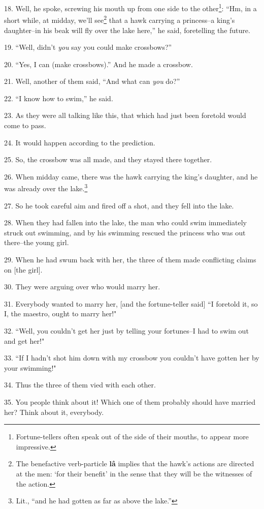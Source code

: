 18. Well, he spoke, screwing his mouth up from one side to the other\footnote{Fortune-tellers often speak out of the side of their mouths, to appear more impressive.}: ``Hm,
in a short while, at midday, we'll see\footnote{The benefactive verb-particle \textbf{lâ} implies that the hawk's actions are directed at the men: `for their benefit' in the sense that they will be the witnesses of the action.} that a hawk carrying a princess--a
king's daughter--in his beak will fly over the lake here,'' he said, foretelling
the future.

19. ``Well, didn't \textit{you} say you could make crossbows?''

20. ``Yes, I can (make crossbows).'' And he made a crossbow.

21. Well, another of them said, ``And what can \textit{you} do?''

22. ``I know how to swim,'' he said.

23. As they were all talking like this, that which had just been foretold would
come to pass.

24. It would happen according to the prediction.

25. So, the crossbow was all made, and they stayed there together.

26. When midday came, there was the hawk carrying the king's daughter, and he was
already over the lake.\footnote{Lit., ``and he had gotten as far as above the lake.''}

27. So he took careful aim and fired off a shot, and they fell into the lake.

28. When they had fallen into the lake, the man who could swim immediately struck
out swimming, and by his swimming rescued the princess who was out there--the young
girl.

29. When he had swum back with her, the three of them made conflicting claims on
[the girl].

30. They were arguing over who would marry her.

31. Everybody wanted to marry her, [and the fortune-teller said] ``I foretold
it, so I, the maestro, ought to marry her!"

32. ``Well, you couldn't get her just by telling your fortunes--I had to
swim out and get her!"

33. ``If I hadn't shot him down with my crossbow you couldn't have gotten
her by your swimming!"

34. Thus the three of them vied with each other.

35. You people think about it! Which one of them probably should have married her?
Think about it, everybody.

